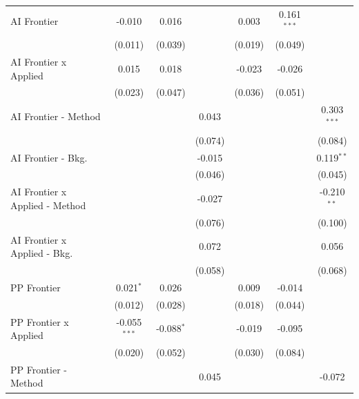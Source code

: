 \begin{tabular}{lcccccc}
   AI Frontier                    & -0.010         & 0.016        &                & 0.003   & 0.161$^{***}$ &   \\   
                                  & (0.011)        & (0.039)      &                & (0.019) & (0.049)       &   \\   
   AI Frontier x Applied          & 0.015          & 0.018        &                & -0.023  & -0.026        &   \\   
                                  & (0.023)        & (0.047)      &                & (0.036) & (0.051)       &   \\   
   AI Frontier - Method           &                &              & 0.043          &         &               & 0.303$^{***}$\\   
                                  &                &              & (0.074)        &         &               & (0.084)\\   
   AI Frontier - Bkg.             &                &              & -0.015         &         &               & 0.119$^{**}$\\   
                                  &                &              & (0.046)        &         &               & (0.045)\\   
   AI Frontier x Applied - Method &                &              & -0.027         &         &               & -0.210$^{**}$\\   
                                  &                &              & (0.076)        &         &               & (0.100)\\   
   AI Frontier x Applied - Bkg.   &                &              & 0.072          &         &               & 0.056\\   
                                  &                &              & (0.058)        &         &               & (0.068)\\   
   PP Frontier                    & 0.021$^{*}$    & 0.026        &                & 0.009   & -0.014        &   \\   
                                  & (0.012)        & (0.028)      &                & (0.018) & (0.044)       &   \\   
   PP Frontier x Applied          & -0.055$^{***}$ & -0.088$^{*}$ &                & -0.019  & -0.095        &   \\   
                                  & (0.020)        & (0.052)      &                & (0.030) & (0.084)       &   \\   
   PP Frontier - Method           &                &              & 0.045          &         &               & -0.072\\   

\end{tabular}
